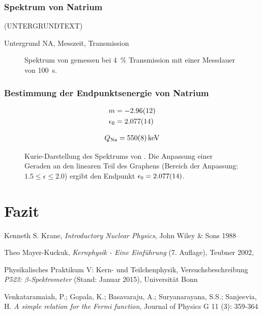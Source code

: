 \documentclass[11pt, a4paper]{article}
\numberwithin{equation}{section}
\begin{document}
\subsubsection{Spektrum von Natrium}
(UNTERGRUNDTEXT)
\begin{table}[h]
	\centering
	
	\caption{Untergrund NA, Messzeit, Transmission}
	\label{tab:untergrund_na}
\end{table}

\begin{figure}[h]
	\centering
	
	\caption{Spektrum von  gemessen bei \SI{4}{\percent} Transmission mit einer Messdauer von \SI{100}{\second}.}
	\label{fig:natrium_spectrum}
\end{figure}

\subsubsection{Bestimmung der Endpunktsenergie von Natrium}
\begin{align}
	m &= \num{-2.96+- 0.12} \\
	\epsilon_0 &= \num{2.077 +- 0.014}
\end{align}

\begin{align}
	Q_\mathrm{Na} = \SI{550 +- 8}{\kilo\electronvolt}
\end{align}

\begin{figure}[h]
	\centering
	
	\caption{Kurie-Darstellung des Spektrums von . Die Anpassung einer Geraden an den linearen Teil des Graphens (Bereich der Anpassung: $\num{1.5} \leq \epsilon \leq {2.0}$) ergibt den Endpunkt $\epsilon_0 = \num{2.077 +- 0.014}$.}
	\label{fig:natrium_kurie}
\end{figure}

\section{Fazit}

\clearpage
\vspace{\fill}
\begin{thebibliography}{19}
	Kenneth S. Krane,
	\emph{Introductory Nuclear Physics},
	John Wiley \& Sons 1988

	Theo Mayer-Kuckuk,
	\emph{Kernphysik - Eine Einführung} (7. Auflage),
	Teubner 2002,

	Physikalisches Praktikum V: Kern- und Teilchenphysik,
	Versuchsbeschreibung \emph{P523: $\beta$-Spektrometer} (Stand: Januar 2015),
	Universität Bonn	

	Venkataramaiah, P.; Gopala, K.; Basavaraju, A.; Suryanarayana, S.S.; Sanjeevia, H.
	\emph{A simple relation for the Fermi function},
	Journal of Physics G 11 (3): 359-364
 
\end{thebibliography}
\end{document}
